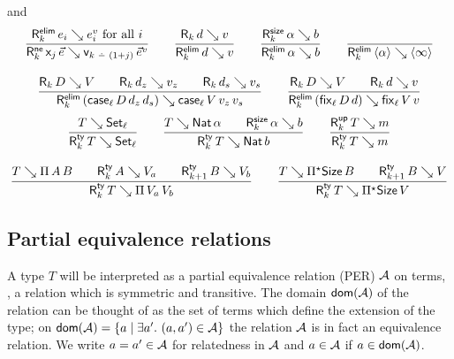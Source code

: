 \documentclass[acmlarge,review,anonymous]{acmart}\settopmatter{printfolios=true}
\begin{document}
 and 
\begin{gather*}
  \ru{%
      \RElim k {e_i} {e^v_i} \mforall i
    }{\RNe k {\lev j\,\vec e} {\ind{k \monus (1+j)}\,\vec e^v}}
\qquad
  \ru{\R k d v
    }{\RElim k d v}
\qquad
  \ru{\RSize k \alpha b
    }{\RElim k \alpha b}
\qquad
  \ru{
    }{\RElim k {\ann \alpha} {\ann \infty}}
\\[2ex]
  \ru{\R k D V \qquad
      \R k {d_z} {v_z} \qquad
      \R k {d_s} {v_s}
    }{\RElim k {(\case[\ell] D {d_z} {d_s})} {\case[\ell] V {v_z} {v_s}}}
\qquad
  \ru{\R k D V \qquad
      \R k d v
    }{\RElim k {(\fix[\ell] D d)} {\fix[\ell] V v}}
\end{gather*}
\begin{gather*}
  \ru{T \evalsto \Set[\ell]
    }{\RTy k T {\Set[\ell]}}
\qquad
  \ru{T \evalsto \Nat \alpha \qquad
      \RSize k \alpha b
    }{\RTy k T {\Nat b}}
\qquad
  \ru{%
      \RUp k T m
    }{\RTy k T m}
\\[2ex]
  \ru{T \evalsto \piT A B \qquad
      \RTy k A {V_a} \qquad
      \RTy {k+1} B {V_b}
    }{\RTy k T {\piT {V_a} V_b}}
\qquad
  \ru{T \evalsto \epiT \Size B \qquad
      \RTy {k+1} B {V}
    }{\RTy k T {\epiT \Size V}}
\end{gather*}




\subsection{Partial equivalence relations}
\label{sec:per}

A type $T$ will be interpreted as a partial equivalence relation (PER) $\mathcal{A}$ on terms, \ie, a relation which is symmetric and transitive. The domain $\mathop{\mathsf{dom}}\nolimits(\mathcal{A})$ of the relation can be thought of as the set of terms which define the extension of the type; on $\mathop{\mathsf{dom}}\nolimits(\mathcal{A}) = \{a \mid \exists a'.\ (a,a') \in \mathcal{A} \}$ the relation $\mathcal{A}$ is in fact an equivalence relation.  We write $a = a' \in \mathcal{A}$ for relatedness in $\mathcal{A}$ and $a \in \mathcal{A}$ if $a \in \mathop{\mathsf{dom}}\nolimits(\mathcal{A})$.
\end{document}
